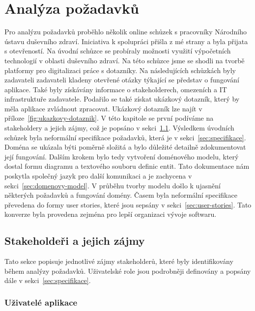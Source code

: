 \chapter{Analýza požadavků}\label{ch:analyza-pozadavku}

Pro analýzu požadavků proběhlo několik online schůzek s pracovníky Národního ústavu duševního zdraví.
Iniciativa k spolupráci přišla z mé strany a byla přijata s otevřeností.
Na úvodní schůzce se probíraly možnosti využití výpočetních technologií v oblasti duševního zdraví.
Na této schůzce jsme se shodli na tvorbě platformy pro digitalizaci práce s dotazníky.
Na následujících schůzkách byly zadavateli zadavateli kladeny otevřené otázky týkající se představ o fungování aplikace.
Také byly získávány informace o stakeholderech, omezeních a IT infrastruktuře zadavatele.
Podařilo se také získat ukázkový dotazník, který by měla aplikace zvládnout zpracovat.
Ukázkový dotazník lze najít v příloze~\ref{fig:ukazkovy-dotaznik}.
V této kapitole se první podíváme na stakeholdery a jejich zájmy, což je popsáno v sekci~\ref{sec:stakeholderi}.
Výsledkem úvodních schůzek byla neformální specifikace požadavků, která je v sekci~\ref{sec:specifikace}.
Doména se ukázala býti poměrně složitá a bylo důležité detailně zdokumentovat její fungování.
Dalším krokem bylo tedy vytvoření doménového modelu, který dostal formu diagramu a textového souboru definic entit.
Tato dokumentace nám poskytla společný jazyk pro další komunikaci a je zachycena v sekci~\ref{sec:domenovy-model}.
V průběhu tvorby modelu došlo k ujasnění některých požadavků a fungování domény.
Časem byla neformální specifikace převedena do formy user stories, které jsou sepsány v sekci~\ref{sec:user-stories}.
Tato konverze byla provedena zejména pro lepší organizaci vývoje softwaru.


\section{Stakeholdeři a jejich zájmy}\label{sec:stakeholderi}

Tato sekce popisuje jednotlivé zájmy stakeholderů, které byly identifikovány během analýzy požadavků.
Uživatelské role jsou podrobněji definovány a popsány dále v sekci~\ref{sec:specifikace}.

\subsection*{Uživatelé aplikace}\label{subsec:uzivatele-aplikace}

